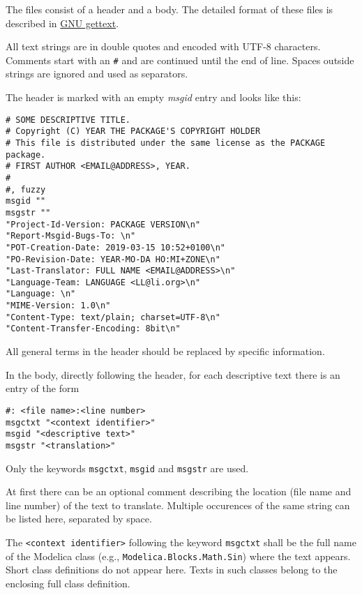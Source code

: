 The files consist of a header and a body.
The detailed format of these files is described in \href{https://www.gnu.org/software/gettext/manual/gettext.pdf}{GNU gettext}.
\begin{nonnormative}
All text strings are in double quotes and encoded with UTF-8 characters.
Comments start with an \lstinline!#! and are continued until the end of line.
Spaces outside strings are ignored and used as separators.

The header is marked with an empty \emph{msgid} entry and looks like this:
\begin{lstlisting}
# SOME DESCRIPTIVE TITLE.
# Copyright (C) YEAR THE PACKAGE'S COPYRIGHT HOLDER
# This file is distributed under the same license as the PACKAGE package.
# FIRST AUTHOR <EMAIL@ADDRESS>, YEAR.
#
#, fuzzy
msgid ""
msgstr ""
"Project-Id-Version: PACKAGE VERSION\n"
"Report-Msgid-Bugs-To: \n"
"POT-Creation-Date: 2019-03-15 10:52+0100\n"
"PO-Revision-Date: YEAR-MO-DA HO:MI+ZONE\n"
"Last-Translator: FULL NAME <EMAIL@ADDRESS>\n"
"Language-Team: LANGUAGE <LL@li.org>\n"
"Language: \n"
"MIME-Version: 1.0\n"
"Content-Type: text/plain; charset=UTF-8\n"
"Content-Transfer-Encoding: 8bit\n"
\end{lstlisting}
All general terms in the header should be replaced by specific information.

In the body, directly following the header, for each descriptive text there is an entry of the form
\begin{lstlisting}
#: <file name>:<line number>
msgctxt "<context identifier>"
msgid "<descriptive text>"
msgstr "<translation>"
\end{lstlisting}
\end{nonnormative}
Only the keywords \lstinline!msgctxt!, \lstinline!msgid! and \lstinline!msgstr! are used.

\begin{nonnormative}
At first there can be an optional comment describing the location (file name and line number) of the text to translate.
Multiple occurences of the same string can be listed here, separated by space.
\end{nonnormative}

The \lstinline!<context identifier>! following the keyword \lstinline!msgctxt! shall be the full name of the Modelica class (e.g., \lstinline!Modelica.Blocks.Math.Sin!) where the text appears.
Short class definitions do not appear here.
Texts in such classes belong to the enclosing full class definition.

